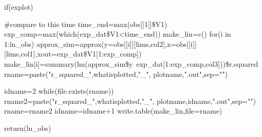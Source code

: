 {{		if(explot){
			\#compare to this time
			time\_end=max(obs[[1]]\$V1)
			exp\_comp=max(which(exp\_dat\$V1<time\_end))
			make\_lin=c()
			for(i in 1:ln\_obs){
				approx\_sim=approx(y=obs[[i]][lims,col2],x=obs[[i]][lims,col1],xout=exp\_dat\$V1[1:exp\_comp])
				make\_lin[i]=summary(lm(approx\_sim\$y~exp\_dat[1:exp\_comp,col3]))\$r.squared
			}
			rname=paste("r\_squared\_",whatisplotted,"\_", plotname,".out",sep="")
			
			idname=2
			while(file.exists(rname)){
				rname2=paste("r\_squared\_",whatisplotted,"\_", plotname,idname,".out",sep="")
				rname=rname2
				idname=idname+1
			}
			write.table(make\_lin,file=rname)
		}
	}
	return(ln\_obs)
}

%
%
%
